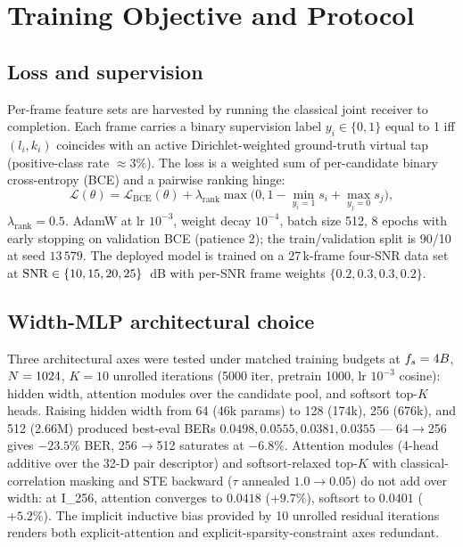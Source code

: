 \section{Training Objective and Protocol}
\label{sec:training}

\subsection{Loss and supervision}
\label{ssec:loss}

Per-frame feature sets are harvested by running the classical joint
receiver to completion. Each frame carries a binary supervision
label $y_i\in\{0,1\}$ equal to 1 iff $(l_i,k_i)$ coincides with an
active Dirichlet-weighted ground-truth virtual tap (positive-class
rate $\approx 3\%$). The loss is a weighted sum of per-candidate
binary cross-entropy (BCE) and a pairwise ranking hinge:
\begin{equation}
\mathcal{L}(\theta) = \mathcal{L}_\text{BCE}(\theta)
 + \lambda_\text{rank}\max\!\bigl(0,
 1{-}\!\!\min_{y_i=1}\!s_i + \!\!\max_{y_j=0}\!s_j\bigr),
\label{eq:loss}
\end{equation}
$\lambda_\text{rank}=0.5$. AdamW at lr $10^{-3}$,
weight decay $10^{-4}$, batch size 512, 8 epochs with early stopping on
validation BCE (patience 2); the train/validation split is 90/10 at
seed $13\,579$. The deployed model is trained on a 27\,k-frame
four-SNR data set at
$\mathrm{SNR}\in\{10,15,20,25\}$~dB with per-SNR frame weights
$\{0.2,0.3,0.3,0.2\}$.

\subsection{Width-MLP architectural choice}
\label{ssec:width_mlp}
Three architectural axes were tested under matched training budgets at
$f_s=4B$, $N=1024$, $K=10$ unrolled iterations (5000 iter, pretrain
1000, lr $10^{-3}$ cosine): hidden width, attention modules over the
candidate pool, and softsort top-$K$ heads. Raising hidden width from
64 (46k params) to 128 (174k), 256 (676k), and 512 (2.66M) produced
best-eval BERs $0.0498, 0.0555, 0.0381, 0.0355$ --- 64$\to$256 gives
$-23.5\%$ BER, 256$\to$512 saturates at $-6.8\%$. Attention modules
(4-head additive over the 32-D pair descriptor) and softsort-relaxed
top-$K$ with classical-correlation masking and STE backward
($\tau$ annealed $1.0\!\to\!0.05$) do not add over width: at I\_256,
attention converges to $0.0418$ ($+9.7\%$), softsort to $0.0401$
($+5.2\%$). The implicit inductive bias provided by 10 unrolled
residual iterations renders both explicit-attention and
explicit-sparsity-constraint axes redundant.

